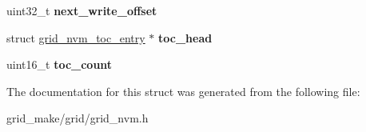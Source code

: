 \begin{DoxyCompactItemize}
\item 
\hypertarget{structgrid__nvm__model_a612356384bdb47b70b3d7783ea3b9a67}{uint32\-\_\-t {\bfseries next\-\_\-write\-\_\-offset}}\label{structgrid__nvm__model_a612356384bdb47b70b3d7783ea3b9a67}

\item 
\hypertarget{structgrid__nvm__model_affd15ecbbd607cabe80fba2e724a32f0}{struct \hyperlink{structgrid__nvm__toc__entry}{grid\-\_\-nvm\-\_\-toc\-\_\-entry} $\ast$ {\bfseries toc\-\_\-head}}\label{structgrid__nvm__model_affd15ecbbd607cabe80fba2e724a32f0}

\item 
\hypertarget{structgrid__nvm__model_adcf8eafc4ac7bae1e7ecf9ef76a23e2e}{uint16\-\_\-t {\bfseries toc\-\_\-count}}\label{structgrid__nvm__model_adcf8eafc4ac7bae1e7ecf9ef76a23e2e}

\end{DoxyCompactItemize}


The documentation for this struct was generated from the following file\-:\begin{DoxyCompactItemize}
\item 
grid\-\_\-make/grid/grid\-\_\-nvm.\-h\end{DoxyCompactItemize}
